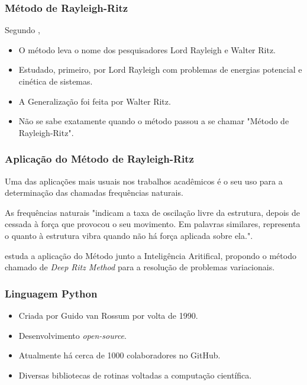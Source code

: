 \documentclass{beamer}
\newif\ifcompilepause
\newcommand{\cpause}{
	\ifcompilepause
	\pause
	\fi
}
\begin{document}
	\begin{frame}
		\frametitle{Método de Rayleigh-Ritz}
		\justify
		
		Segundo , 
		\begin{itemize}
			\justifying
			\item O método leva o nome dos pesquisadores Lord Rayleigh e Walter Ritz.
			\cpause
			\item Estudado, primeiro, por Lord Rayleigh com problemas de energias potencial e cinética de sistemas.
			\cpause
			\item A Generalização foi feita por Walter Ritz.
			\cpause
			\item Não se sabe exatamente quando o método passou a se chamar "Método de Rayleigh-Ritz".
		\end{itemize}
	\end{frame}
	
	\begin{frame}
		\frametitle{Aplicação do Método de Rayleigh-Ritz}
		\justify

		Uma das aplicações mais usuais nos trabalhos acadêmicos é o seu uso para a determinação das chamadas frequências naturais.
		\vspace{10pt}
		\cpause
		
		As frequências naturais "indicam a taxa de oscilação livre da estrutura, depois de cessada à força que provocou o seu movimento. Em palavras similares, representa o quanto à estrutura vibra quando não há força aplicada sobre ela."\text{ }\cite[p. 1]{Vasquez2015}.
		\vspace{10pt}
		\cpause
		
		 estuda a aplicação do Método junto a Inteligência Aritifical, propondo o método chamado de \textit{Deep Ritz Method} para a resolução de problemas variacionais.
	\end{frame}
	
	\begin{frame}
		\frametitle{Linguagem Python}
		\justify
		
		\begin{itemize}
			\justifying
			\item Criada por Guido van Rossum por volta de 1990.
			\cpause
			\item Desenvolvimento \textit{open-source}.
			\cpause
			\item Atualmente há cerca de 1000 colaboradores no GitHub.
			\cpause
			\item Diversas bibliotecas de rotinas voltadas a computação científica.
		\end{itemize}
	\end{frame}
\end{document}
